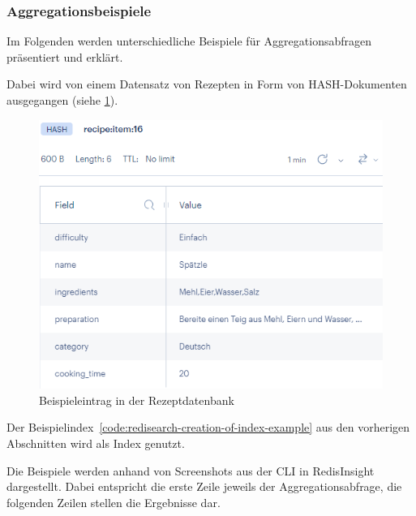 \subsubsection{Aggregationsbeispiele}
Im Folgenden werden unterschiedliche Beispiele für Aggregationsabfragen präsentiert und erklärt.

Dabei wird von einem Datensatz von Rezepten in Form von HASH-Dokumenten ausgegangen (siehe \cref{pic:redisearch-aggregation-example-entry}).

\begin{figure}[!h]  %
    \centering      %
    \includegraphics[width=1\textwidth]{pictures/redis/redisearch_aggregation_example_entry.png}
    \caption{Beispieleintrag in der Rezeptdatenbank}      %
    \label{pic:redisearch-aggregation-example-entry}    %
\end{figure}

Der Beispielindex~\ref{code:redisearch-creation-of-index-example} aus den vorherigen Abschnitten  wird als Index genutzt.


Die Beispiele werden anhand von Screenshots aus der CLI in RedisInsight dargestellt. Dabei entspricht die erste Zeile jeweils der Aggregationsabfrage, die folgenden Zeilen stellen die Ergebnisse dar.



